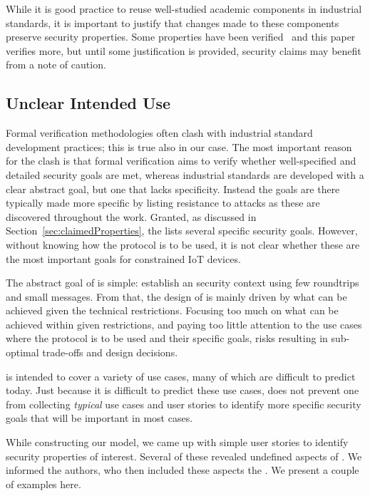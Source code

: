 \documentclass[runningheads, envcountsame, hidelinks, a4paper, x11names]{llncs}
\begin{document}
While it is good practice to reuse well-studied academic components in
industrial standards, it is important to justify that changes made to these
components preserve security properties.
%
Some properties have been verified~\cite{DBLP:conf/secsr/BruniJPS18} and this paper verifies more, but until some justification is provided, security
claims may benefit from a note of caution.

\subsection{Unclear Intended Use}
\label{sec:unclearProtocolUse}
Formal verification methodologies often clash with industrial standard
development practices; this is true also in our case.
%
The most important reason for the clash is that formal verification aims to
verify whether well-specified and detailed security goals are met, whereas
industrial standards are developed with a clear abstract goal,
but one that lacks specificity.
%
Instead the goals are there typically made more specific by listing resistance
to attacks as these are discovered throughout the work.
%
Granted, as discussed in Section~\ref{sec:claimedProperties}, the \mSpec{} lists
several specific security goals.
%
However, without knowing how the protocol is to be used,
it is not clear whether these are the most important goals for constrained IoT
devices.
%

The abstract goal of \mEdhoc{} is simple: establish an \mOscore{} security
context using few roundtrips and small messages.
%
From that, the design of \mEdhoc{} is mainly driven by what
can be achieved given the technical restrictions.
%
Focusing too much on what can be achieved within given restrictions, and paying
too little attention to the use cases where the
protocol is to be used and their specific goals, risks resulting in
sub-optimal trade-offs and design decisions.
%

\mEdhoc{} is intended to cover a variety of use cases, many of which are
difficult to predict today.
%
Just because it is difficult to predict these use cases, does not
prevent one from collecting \emph{typical} use cases and user stories
to identify more specific security goals that will be important in most cases.
%

While constructing our model, we came up with simple user stories to identify
security properties of interest.
%
Several of these revealed undefined aspects of \mEdhoc{}.
%
We informed the \mEdhoc{} authors, who then included these aspects the \mSpec{}.
%
We present a couple of examples here.\\
%
\end{document}
